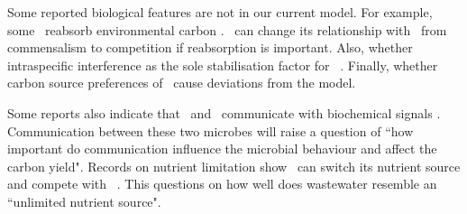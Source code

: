 \documentclass[../thesis.tex]{subfiles} %
\begin{document}
Some reported biological features are not in our current model.  For example, some \phy\ reabsorb environmental carbon \autocite{j1989respiration,bratbak1985phytoplankton,samejima1958heterotrophic}.  \Phy\ can change its relationship with \bac\ from commensalism to competition \autocite{bratbak1985phytoplankton} if reabsorption is important.  Also, whether intraspecific interference as the sole stabilisation factor for \phy\ \autocite{o2017unexpected,savage2004effects,allen2007recasting,bernhardt2018metabolic}.  Finally, whether carbon source preferences \autocite{amon1996bacterial} of \bac\ cause deviations from the model.




Some reports also indicate that \phy\ and \bac\ communicate with biochemical signals \autocite{beliaev2014inference,amin2012interactions}.  Communication between these two microbes will raise a question of ``how important do communication influence the microbial behaviour and affect the carbon yield".  Records on nutrient limitation show \bac\ can switch its nutrient source and compete with \phy\ \autocite{danger2007bacteria}.  This questions on how well does wastewater resemble an ``unlimited nutrient source".
\end{document}
